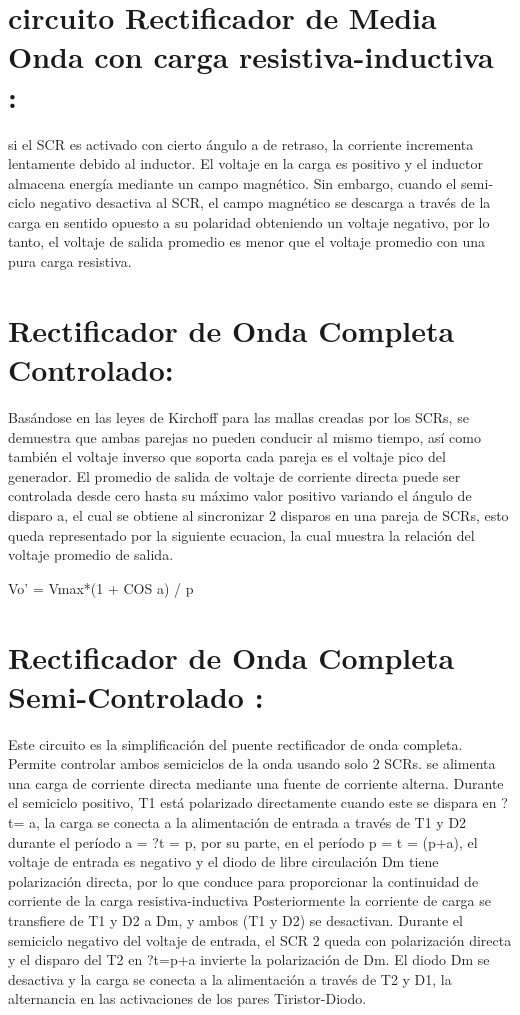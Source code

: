 \documentclass[11pt,a4paper]{article}
\begin{document}
\section{circuito Rectificador de Media Onda con carga resistiva-inductiva :}
si el SCR es activado con cierto ángulo a de retraso, la corriente incrementa lentamente debido al inductor. El voltaje en la carga es positivo y el inductor almacena energía mediante un campo magnético. Sin embargo, cuando el semi-ciclo negativo desactiva al SCR, el campo magnético se descarga a través de la carga en sentido opuesto a su polaridad obteniendo un voltaje negativo, por lo tanto, el voltaje de salida promedio es menor que el voltaje promedio con una pura carga resistiva.
\section{Rectificador de Onda Completa Controlado:}
Basándose en las leyes de Kirchoff para las mallas creadas por los SCRs, se demuestra que ambas parejas no pueden conducir al mismo tiempo, así como también el voltaje
inverso que soporta cada pareja es el voltaje pico del generador. El promedio de salida de voltaje de corriente directa puede ser controlada desde cero hasta su máximo valor positivo variando el ángulo de disparo a, el cual se obtiene al sincronizar 2 disparos en una pareja de SCRs, esto queda representado por la siguiente ecuacion, la cual muestra la relación del voltaje promedio de salida.
\begin{center}
Vo' = Vmax*(1 + COS a) / p\\
\end{center}
\section{Rectificador de Onda Completa Semi-Controlado :}
Este circuito es la simplificación del puente rectificador de onda completa. Permite controlar ambos semiciclos de la onda usando solo 2 SCRs. se alimenta una carga de corriente directa mediante una fuente de corriente alterna.
Durante el semiciclo positivo, T1 está polarizado directamente cuando este se dispara en ?t= a, la carga se conecta a la alimentación de entrada a través de T1 y D2 durante el período a = ?t = p, por su parte, en el período p = t = (p+a), el voltaje de entrada es negativo y el diodo de libre circulación Dm tiene polarización directa, por lo que conduce para proporcionar la continuidad de corriente de la carga resistiva-inductiva Posteriormente la corriente de carga se transfiere de T1 y D2 a Dm, y ambos (T1 y D2) se desactivan. Durante el semiciclo negativo del voltaje de entrada, el SCR 2 queda con polarización directa y el disparo del T2 en ?t=p+a invierte la polarización de Dm. El diodo Dm se desactiva y la carga se conecta a la alimentación a través de T2 y D1, la alternancia en las activaciones de los pares Tiristor-Diodo.
\end{document}

